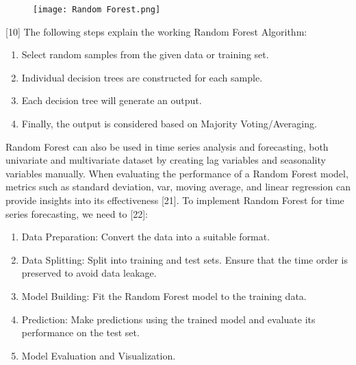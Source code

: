 \documentclass{ieeeojies}
\begin{document}
\begin{figure}[H]
    \centering
    \begin{minipage}{0.5\textwidth}
        \centering
        \texttt{[image: Random Forest.png]}
    \end{minipage}
\end{figure}
[10] The following steps explain the working Random Forest Algorithm:
\begin{enumerate}
  \item Select random samples from the given data or training set.
  \item Individual decision trees are constructed for each sample.
  \item Each decision tree will generate an output.
  \item Finally, the output is considered based on Majority Voting/Averaging.
\end{enumerate}
\indent Random Forest can also be used in time series analysis and forecasting, both univariate and multivariate dataset by creating lag variables and seasonality variables manually. When evaluating the performance of a Random Forest model, metrics such as standard deviation, var, moving average, and linear regression can provide insights into its effectiveness [21]. To implement Random Forest for time series forecasting, we need to [22]:
\begin{enumerate}
  \item Data Preparation: Convert the data into a suitable format.
  \item Data Splitting: Split into training and test sets. Ensure that the time order is preserved to avoid data leakage.
  \item Model Building: Fit the Random Forest model to the training data.
  \item Prediction: Make predictions using the trained model and evaluate its performance on the test set.
  \item Model Evaluation and Visualization.
\end{enumerate}
\end{document}
